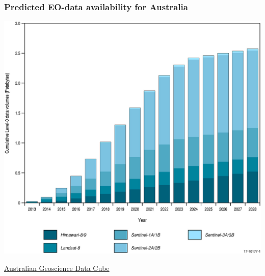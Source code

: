 \begin{frame}

\frametitle{Predicted EO-data availability for Australia}

\begin{center}
 \includegraphics[height=0.8\textheight]{./images/eo-dataamount_australia.jpg}
\end{center}

\href{http://nci.org.au/services/virtual-laboratories/australian-geoscience-data-cube/}{Australian Geoscience Data Cube}

\end{frame}


